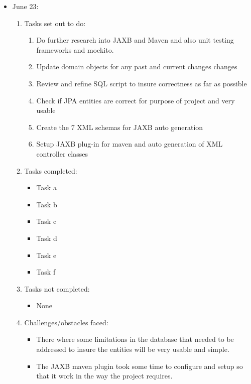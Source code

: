 \documentclass[12pt]{article}
\begin{document}
	\begin{itemize}
		\item June 23:
		\begin{enumerate}
			\item Tasks set out to do:
			\begin{enumerate}
				\item Do further research into JAXB and Maven and also unit testing frameworks and mockito.
				\item Update domain objects for any past and current changes changes
				\item Review and refine SQL script to insure correctness as far as possible
				\item Check if JPA entities are correct for purpose of project and very usable
				\item Create the 7 XML schemas for JAXB auto generation
				\item Setup JAXB plug-in for maven and auto generation of XML controller classes 
			\end{enumerate}
			\item Tasks completed:
			\begin{itemize}
				\item Task a
				\item Task b
				\item Task c
				\item Task d
				\item Task e
				\item Task f
			\end{itemize}
			\item Tasks not completed:
			\begin{itemize}
				\item None
			\end{itemize}
			\item Challenges/obstacles faced:
			\begin{itemize}
				\item There where some limitations in the database that needed to be addressed to insure the entities will be very usable and simple.
				\item The JAXB maven plugin took some time to configure and setup so that it work in the way the project requires.
			\end{itemize}			
		\end{enumerate}
	\end{itemize}
	
\end{document}
